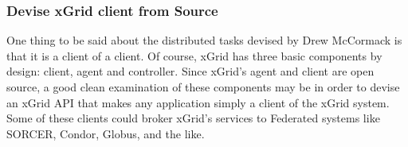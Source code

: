 \documentclass[11pt]{article}
\begin{document}
\subsubsection {Devise xGrid client from Source}
One thing to be said about the distributed tasks devised by Drew McCormack is that it is a client of a client.  Of course, xGrid has three basic components by design: client, agent and controller.  Since xGrid's agent and client are open source, a good clean examination of these components may be in order to devise an xGrid API that makes any application simply a client of the xGrid system.  Some of these clients could broker xGrid's services to Federated systems like SORCER, Condor, Globus, and the like.  


 
\end{document}
